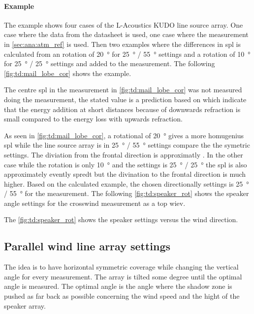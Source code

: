 \paragraph{Example} The example shows four cases of the L-Acoustics KUDO line source array. One case where the data from the datasheet is used, one case where the measurement in \autoref{sec:ana:atm_ref} is used. Then two examples where the differences in \gls{spl} is calculated from an rotation of \SI{20}{\degree} for \SI{25}{\degree} / \SI{55}{\degree} settings and a rotation of  \SI{10}{\degree} for \SI{25}{\degree} / \SI{25}{\degree} settings and added to the measurement. The following \autoref{fig:td:mail_lobe_cor} shows the example.



The centre \gls{spl} in the measurement in \autoref{fig:td:mail_lobe_cor} was not measured doing the measurement, the stated value is a prediction based on \citep{review_of_sound} which indicate that the energy addition at short distances because of downwards refraction is small compared to the energy loss with upwards refraction. 

As seen in \autoref{fig:td:mail_lobe_cor}, a rotational of \SI{20}{\degree} gives a more homugenius \gls{spl} while the line source array is in \SI{25}{\degree} / \SI{55}{\degree} settings compare the the symetric settings. The diviation from the frontal direction is approximatly . In the other case while the rotation is only \SI{10}{\degree} and the settings is \SI{25}{\degree} / \SI{25}{\degree} the \gls{spl} is also approximately evently spredt but the divination to the frontal direction is much higher. Based on the calculated example, the chosen directionally settings is \SI{25}{\degree} / \SI{55}{\degree} for the measurement. The following \autoref{fig:td:speaker_rot} shows the speaker angle settings for the crosswind measurement as a top wiev. 


The \autoref{fig:td:speaker_rot} shows the speaker settings versus the wind direction.

\subsection{Parallel wind line array settings}\label{sub:des:par_set}
The idea is to have horizontal symmetric coverage while changing the vertical angle for every measurement. The array is tilted some degree until the optimal angle is measured. The optimal angle is the angle where the shadow zone is pushed as far back as possible concerning the wind speed and the hight of the speaker array. 



